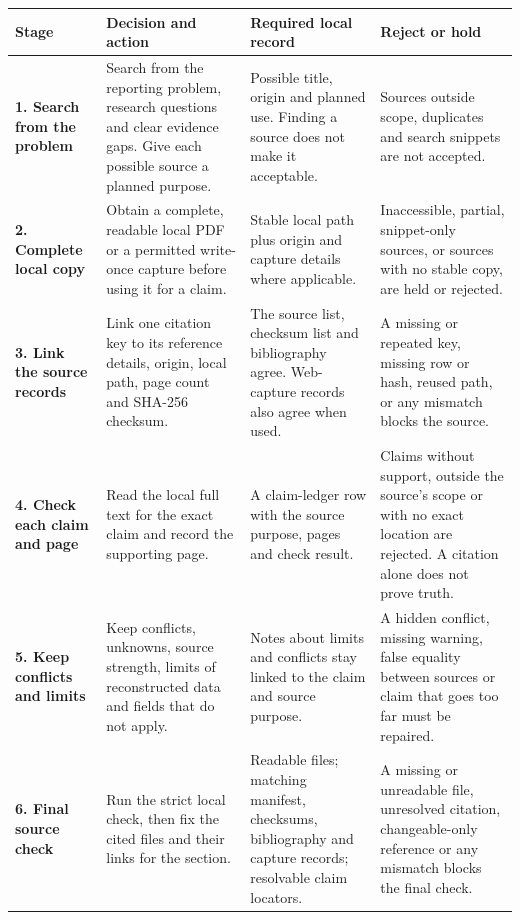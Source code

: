 \clearpage
\begin{table}[p]
  \centering
  \footnotesize
  \setlength{\tabcolsep}{3pt}
  \renewcommand{\arraystretch}{1.18}
  \begin{tabularx}{\textwidth}{@{}P{0.17\textwidth}Y P{0.25\textwidth}P{0.24\textwidth}@{}}
    \toprule
    \textbf{Stage} &
    \textbf{Decision and action} &
    \textbf{Required local record} &
    \textbf{Reject or hold} \\
    \midrule
    \textbf{1. Search from the problem} &
    Search from the reporting problem, research questions and clear evidence gaps. Give each possible source a planned purpose. &
    Possible title, origin and planned use. Finding a source does not make it acceptable. &
    Sources outside scope, duplicates and search snippets are not accepted. \\
    \addlinespace
    \textbf{2. Complete local copy} &
    Obtain a complete, readable local PDF or a permitted write-once capture before using it for a claim. &
    Stable local path plus origin and capture details where applicable. &
    Inaccessible, partial, snippet-only sources, or sources with no stable copy, are held or rejected. \\
    \addlinespace
    \textbf{3. Link the source records} &
    Link one citation key to its reference details, origin, local path, page count and SHA-256 checksum. &
    The source list, checksum list and bibliography agree. Web-capture records also agree when used. &
    A missing or repeated key, missing row or hash, reused path, or any mismatch blocks the source. \\
    \addlinespace
    \textbf{4. Check each claim and page} &
    Read the local full text for the exact claim and record the supporting page. &
    A claim-ledger row with the source purpose, pages and check result. &
    Claims without support, outside the source's scope or with no exact location are rejected. A citation alone does not prove truth. \\
    \addlinespace
    \textbf{5. Keep conflicts and limits} &
    Keep conflicts, unknowns, source strength, limits of reconstructed data and fields that do not apply. &
    Notes about limits and conflicts stay linked to the claim and source purpose. &
    A hidden conflict, missing warning, false equality between sources or claim that goes too far must be repaired. \\
    \addlinespace
    \textbf{6. Final source check} &
    Run the strict local check, then fix the cited files and their links for the section. &
    Readable files; matching manifest, checksums, bibliography and capture records; resolvable claim locators. &
    A missing or unreadable file, unresolved citation, changeable-only reference or any mismatch blocks the final check. \\
    \bottomrule
  \end{tabularx}


\end{table}
